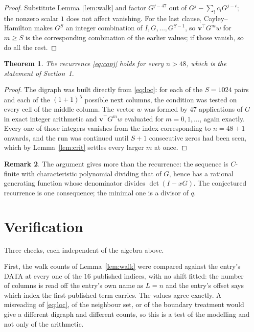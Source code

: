 \documentclass[11pt,a4paper]{article}
\theoremstyle{plain}
\newtheorem{theorem}{Theorem}
\theoremstyle{definition}
\newtheorem{remark}[theorem]{Remark}
\begin{document}
\begin{proof}
Substitute Lemma~\ref{lem:walk} and factor $G^{j-47}$ out of
$G^{j}-\sum_ic_iG^{j-i}$; the nonzero scalar $1$ does not affect
vanishing. For the last clause, Cayley--Hamilton makes $G^{S}$ an integer combination of
$I,G,\dots,G^{S-1}$, so $\mathbf{v}^{\!\top}G^{m}w$ for $m\ge S$ is the corresponding
combination of the earlier values; if those vanish, so do all the rest.
\end{proof}

\begin{theorem}
The recurrence \eqref{eq:conj} holds for every $n>48$, which is the statement of
Section~1.
\end{theorem}

\begin{proof}
The digraph was built directly from \eqref{eq:loc}: for each of the $S=1024$ pairs and each
of the $(1+1)^{5}$ possible next columns, the condition was tested on every cell of
the middle column. The vector $w$ was formed by $47$ applications of $G$ in exact integer
arithmetic and $\mathbf{v}^{\!\top}G^{m}w$ evaluated for $m=0,1,\dots$, again exactly.
Every one of those integers vanishes from the index corresponding to $n=48+1$ onwards,
and the run was continued until $S+1$ consecutive zeros had been seen, which by
Lemma~\ref{lem:crit} settles every larger $m$ at once.
\end{proof}

\begin{remark}
The argument gives more than the recurrence: the sequence is $C$-finite with characteristic
polynomial dividing that of $G$, hence has a rational generating function whose denominator
divides $\det(I-xG)$. The conjectured recurrence is one consequence; the minimal one is a
divisor of $q$.
\end{remark}

\section{Verification}

Three checks, each independent of the algebra above.

First, the walk counts of Lemma~\ref{lem:walk} were compared against the entry's DATA at
every one of the $16$ published indices, with no shift fitted: the number of columns is
read off the entry's own name as $L=n$ and the entry's offset says which index the first
published term carries. The values agree exactly. A misreading of \eqref{eq:loc}, of the
neighbour set, or of the boundary treatment would give a different digraph and different
counts, so this is a test of the modelling and not only of the arithmetic.
\end{document}
